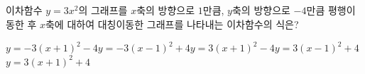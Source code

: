이차함수 $y=3x^2$의 그래프를 $x$축의 방향으로 $1$만큼, $y$축의 방향으로 $-4$만큼 평행이동한 후 $x$축에 대하여 대칭이동한 그래프를 나타내는 이차함수의 식은?
\begin{choicesii}{$y=-3(x+1)^2-4$}{$y=-3(x-1)^2+4$}{$y=3(x+1)^2-4$}{$y=3(x-1)^2+4$}{$y=3(x+1)^2+4$}\end{choicesii}
